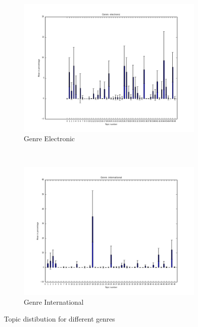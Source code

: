 \begin{figure}
\begin{subfigure}[b]{0.3\textwidth}
                \label{fig:topicdist_reggae}
        \end{subfigure}%
        ~ %
        \begin{subfigure}[b]{0.3\textwidth}
                \includegraphics[width=\textwidth]{bar_charts/electronic.png}
                \caption{Genre Electronic}
                \label{fig:topicdist_electronic}
        \end{subfigure}
        ~ %
        \begin{subfigure}[b]{0.3\textwidth}
                \includegraphics[width=\textwidth]{bar_charts/international.png}
                \caption{Genre International}
                \label{fig:topicdist_international}
        \end{subfigure}
        \caption{Topic distibution for different genres}\label{fig:topicdist}
\end{figure}


